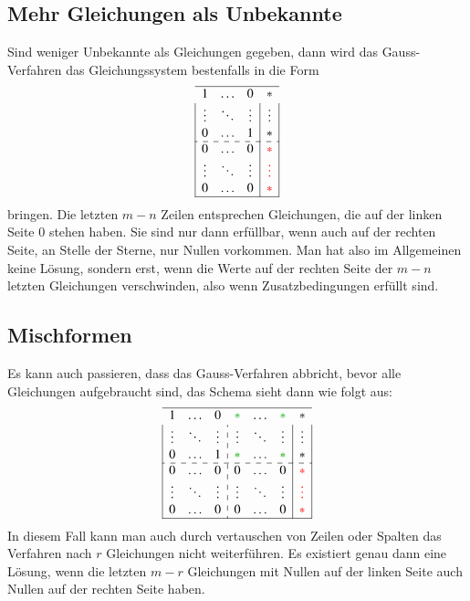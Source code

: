 \subsection{Mehr Gleichungen als Unbekannte}
Sind weniger Unbekannte als Gleichungen gegeben, dann wird das Gauss-Verfahren
das Gleichungssystem bestenfalls in die Form
\[
\begin{array}{|ccc|c|}
\hline
1&\dots&0&*\\
\vdots&\ddots&\vdots&\vdots\\
0&\dots&1&*\\
\hdashline
0&\dots&0&\color{red}*\\
\vdots&\ddots&\vdots&\color{red}\vdots\\
0&\dots&0&\color{red}*\\
\hline
\end{array}
\]
bringen.
Die letzten $m-n$ Zeilen entsprechen Gleichungen, die auf
der linken Seite $0$ stehen haben.
Sie sind nur dann erfüllbar, wenn
auch auf der rechten Seite, an Stelle der Sterne, nur Nullen vorkommen.
Man hat also im Allgemeinen keine Lösung, sondern erst, wenn die Werte
auf der rechten Seite der $m-n$ letzten Gleichungen verschwinden,
also wenn Zusatzbedingungen erfüllt sind.

\subsection{Mischformen}
Es kann auch passieren, dass das Gauss-Verfahren abbricht, bevor alle
Gleichungen aufgebraucht sind, das Schema sieht dann wie folgt aus:
\begin{equation}
\definecolor{greenT}{rgb}{0,0.666,0}
\begin{array}{|ccc:ccc|c|}
\hline
1&\dots&0 &\color{greenT}*&\dots&\color{greenT}*&*\\
\vdots&\ddots&\vdots &\vdots&\ddots&\vdots&\vdots\\
0&\dots&1 &\color{greenT}*&\dots&\color{greenT}*&*\\
\hdashline
0&\dots&0 &0&\dots&0&\color{red}*\\
\vdots&\ddots&\vdots &\vdots&\ddots&\vdots&\color{red}\vdots\\
0&\dots&0 &0&\dots&0&\color{red}*\\
\hline
\end{array}
\label{rangdef}
\end{equation}
In diesem Fall kann man auch durch vertauschen von Zeilen oder Spalten
das Verfahren nach $r$ Gleichungen nicht weiterführen.
Es existiert genau dann eine Lösung, wenn die letzten $m-r$ Gleichungen
mit Nullen auf der linken Seite auch Nullen auf der
rechten Seite haben.

